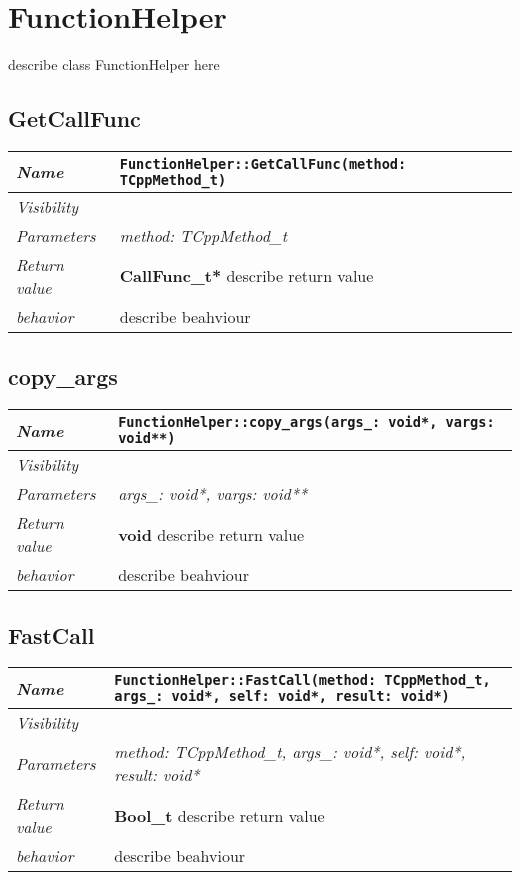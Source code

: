 
 \chapter{FunctionHelper}
describe class FunctionHelper here
\section{GetCallFunc}
\begin{longtable}{p{3cm} @{\hskip 1cm} p{12cm}}
 \hline
\textit{Name} & \texttt{FunctionHelper::GetCallFunc(method: TCppMethod_t)}\\
\hline
 \textit{Visibility} & \\
\hline
\textit{Parameters} & \textit{method: TCppMethod_t}\\
\hline
\textit{Return value} & \textbf{ CallFunc_t*} describe return value\\
  \hline
 \textit{behavior} & describe beahviour \\
\hline
\end{longtable} \pagebreak
 \section{copy_args}
\begin{longtable}{p{3cm} @{\hskip 1cm} p{12cm}}
 \hline
\textit{Name} & \texttt{FunctionHelper::copy_args(args_: void*, vargs: void**)}\\
\hline
 \textit{Visibility} & \\
\hline
\textit{Parameters} & \textit{args_: void*, vargs: void**}\\
\hline
\textit{Return value} & \textbf{ void} describe return value\\
  \hline
 \textit{behavior} & describe beahviour \\
\hline
\end{longtable} \pagebreak
 \section{FastCall}
\begin{longtable}{p{3cm} @{\hskip 1cm} p{12cm}}
 \hline
\textit{Name} & \texttt{FunctionHelper::FastCall(method: TCppMethod_t, args_: void*, self: void*, result: void*)}\\
\hline
 \textit{Visibility} & \\
\hline
\textit{Parameters} & \textit{method: TCppMethod_t, args_: void*, self: void*, result: void*}\\
\hline
\textit{Return value} & \textbf{ Bool_t} describe return value\\
  \hline
 \textit{behavior} & describe beahviour \\
\hline
\end{longtable} \pagebreak
